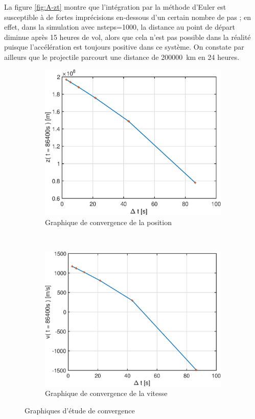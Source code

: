 \documentclass[a4paper,12pt,twoside]{article}
\begin{document}
La figure \ref{fig:A-zt} montre que l'intégration par la méthode d'Euler est susceptible à de fortes imprécisions en-dessous d'un certain nombre de pas ;
en effet, dans la simulation avec nsteps=1000, la distance au point de départ diminue après 15 heures de vol, alors que cela n'est pas possible dans la réalité puisque l'accélération est toujours positive dans ce système.
On constate par ailleurs que le projectile parcourt une distance de \SI{200000}{\kilo\meter} en 24 heures.\\

\begin{figure}[h]
	\centering
	\begin{subfigure}[b]{0.45\textwidth}
		\includegraphics[width=\textwidth]{graphs/zConvA.eps}
		\caption{Graphique de convergence de la position}
		\label{fig:A-zConv}
	\end{subfigure}
	~
	\begin{subfigure}[b]{0.45\textwidth}
		\includegraphics[width=\textwidth]{graphs/vConvA.eps}
		\caption{Graphique de convergence de la vitesse}
		\label{fig:A-vConv}
	\end{subfigure}
	\caption{Graphiques d'étude de convergence}
	\label{fig:A-conv}
\end{figure}
\end{document}
